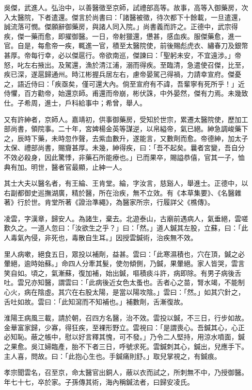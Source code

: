 \begin{pinyinscope}
吳傑，武進人。弘治中，以善醫徵至京師，試禮部高等。故事，高等入御藥房，次入太醫院，下者遣還。傑言於尚書曰：「諸醫被徵，待次都下十餘載，一旦遣還，誠流落可憫。傑願辭御藥房，與諸人同入院。」尚書義而許之。正德中，武宗得疾，傑一藥而愈，即擢御醫。一日，帝射獵還，憊甚，感血疾。服傑藥愈，進一官。自是，每愈帝一疾，輒進一官，積至太醫院使，前後賜彪虎衣、繡春刀及銀幣甚厚。帝每行幸，必以傑扈行。帝欲南巡，傑諫曰：「聖躬未安，不宜遠涉。」帝怒，叱左右掖出。及駕還，漁於清江浦，溺而得疾。至臨清，急遣使召傑，比至，疾已深，遂扈歸通州。時江彬握兵居左右，慮帝晏駕己得禍，力請幸宣府。傑憂之，語近侍曰：「疾亟矣，僅可還大內。倘至宣府有不諱，吾輩寧有死所乎！」近侍懼，百方勸帝，始還京師。甫還而帝崩，彬伏誅，中外晏然，傑有力焉。未幾致仕。子希周，進士，戶科給事中；希曾，舉人。

又有許紳者，京師人。嘉靖初，供事御藥房，受知於世宗，累遷太醫院使，歷加工部尚書，領院事。二十年，宮婢楊金英等謀逆，以帛縊帝，氣已絕。紳急調峻藥下之，辰時下藥，未時忽作聲，去紫血數升，遂能言，又數劑而愈。帝德紳，加太子太保、禮部尚書，賜齎甚厚。未幾，紳得疾，曰：「吾不起矣。曩者宮變，吾自分不效必殺身，因此驚悸，非藥石所能療也。」已而果卒，賜謚恭僖，官其一子，恤典有加。明世，醫者官最顯，止紳一人。

其士大夫以醫名者，有王綸、王肯堂。綸，字汝言，慈谿人，舉進士。正德中，以右副都御史巡撫湖廣，精於醫，所在治疾，無不立效。有《本草集要》、《名醫雜著》行於世。肯堂所著《證治準繩》，為醫家所宗，行履詳父《樵傳》。

凌雲，字漢章，歸安人。為諸生，棄去。北遊泰山，古廟前遇病人，氣垂絕，雲嗟歎久之。一道人忽曰：「汝欲生之乎？」曰：「然。」道人鍼其左股，立蘇，曰：「此人毒氣內侵，非死也，毒散自生耳。」因授雲鍼術，治疾無不效。

里人病嗽，絕食五日，眾投以補劑，益甚。雲曰：「此寒濕積也，穴在頂，鍼之必暈絕，逾時始蘇。」命四人分牽其髮，使勿傾側，乃鍼，果暈絕。家人皆哭，雲言笑自如。頃之，氣漸蘇，復加補，始出鍼，嘔積痰斗許，病即除。有男子病後舌吐。雲兄亦知醫，謂雲曰：「此病後近女色太蚤也。舌者心之苗，腎水竭，不能制心火，病在陰虛。其穴在右股太陽，是當以陽攻陰。」雲曰：「然。」如其穴針之，舌吐如故。雲曰：「此知瀉而不知補也。」補數劑，舌漸復故。

淮陽王病風三載，請於朝，召四方名醫，治不效。雲投以鍼，不三日，行步如故。金華富家歸，少寡，得狂疾，至裸形野立。雲視曰：「是謂喪心。吾鍼其心，心正必知恥。蔽之帳中，慰以好言釋其愧，可不發。」乃令二人堅持，用涼水噴面，鍼之果愈。吳江婦臨產，胎不下者三日，呼號求死。雲鍼刺其心，鍼出，兒應手下。主人喜，問故。曰：「此抱心生也。手鍼痛則舒。」取兒掌視之，有鍼痕。

孝宗聞雲名，召至京，命太醫官出銅人，蔽以衣而試之，所刺無不中，乃授御醫。年七十七，卒於家。子孫傳其術，海內稱鍼法者，曰歸安凌氏。


\end{pinyinscope}

